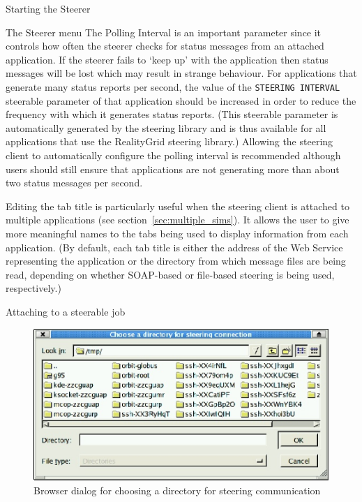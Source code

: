 \documentclass[a4paper,twoside]{article}
\begin{document}
\begin{section}{Starting the Steerer}
\begin{subsection}{The Steerer menu}
The Polling Interval is an important parameter since it controls how
often the steerer checks for status messages from an attached
application.  If the steerer fails to `keep up' with the application
then status messages will be lost which may result in strange
behaviour.  For applications that generate many status reports per
second, the value of the \texttt{STEERING INTERVAL} steerable
parameter of that application should be increased in order to reduce
the frequency with which it generates status reports. (This steerable
parameter is automatically generated by the steering library and is
thus available for all applications that use the RealityGrid steering
library.)  Allowing the steering client to automatically configure the
polling interval is recommended although users should still ensure
that applications are not generating more than about two status
messages per second.

Editing the tab title is particularly useful when the steering client
is attached to multiple applications (see
section~\ref{sec:multiple_sims}).  It allows the user to give more
meaningful names to the tabs being used to display information from
each application.  (By default, each tab title is either the address
of the Web Service representing the application or the directory from
which message files are being read, depending on whether SOAP-based or
file-based steering is being used, respectively.)

\end{subsection}

\begin{subsection}{Attaching to a steerable job}

\begin{figure}
\centerline{\includegraphics{dir_browser.eps}}
\caption{Browser dialog for choosing a directory for steering communication}
\label{fig:dir_browser}
\end{figure}


\end{subsection}
\end{section}
\end{document}
